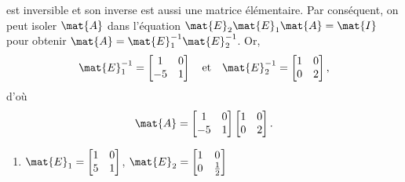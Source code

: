 \begin{exercice}
\begin{sol}
\begin{enumerate}
      est inversible et son inverse est aussi une matrice élémentaire.
      Par conséquent, on peut isoler $\mat{A}$ dans l'équation
      $\mat{E}_2 \mat{E}_1 \mat{A} = \mat{I}$ pour obtenir $\mat{A} =
      \mat{E}_1^{-1} \mat{E}_2^{-1}$. Or,
      \begin{displaymath}
        \mat{E}_1^{-1} =
        \begin{bmatrix} 1&0 \\ -5&1 \end{bmatrix} \quad
        \text{et} \quad
        \mat{E}_2^{-1} = \begin{bmatrix} 1&0 \\ 0&2 \end{bmatrix},
      \end{displaymath}
      d'où
      \begin{displaymath}
        \mat{A} =
        \begin{bmatrix} 1&0 \\ -5&1 \end{bmatrix}
        \begin{bmatrix} 1&0 \\  0&2 \end{bmatrix}.
      \end{displaymath}
    \end{enumerate}
  \end{sol}
  \begin{rep}
    \begin{enumerate}
    \item $\mat{E}_1 = \begin{bmatrix} 1&0 \\ 5&1 \end{bmatrix}$,
      $\mat{E}_2 = \begin{bmatrix} 1&0 \\ 0&\frac{1}{2} \end{bmatrix}$
    \end{enumerate}
  \end{rep}
\end{exercice}

